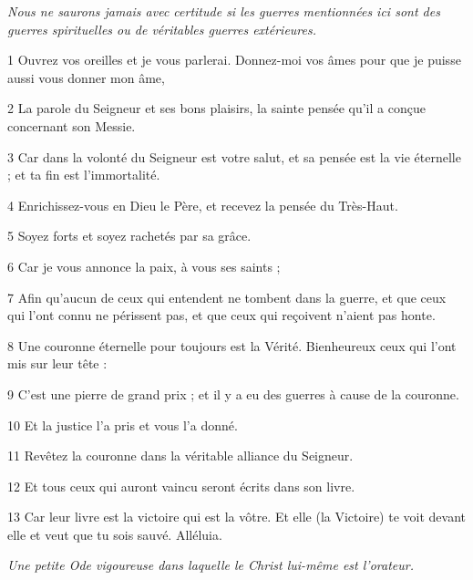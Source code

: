 
\par \textit{Nous ne saurons jamais avec certitude si les guerres mentionnées ici sont des guerres spirituelles ou de véritables guerres extérieures.}

\par 1 Ouvrez vos oreilles et je vous parlerai. Donnez-moi vos âmes pour que je puisse aussi vous donner mon âme,
\par 2 La parole du Seigneur et ses bons plaisirs, la sainte pensée qu'il a conçue concernant son Messie.
\par 3 Car dans la volonté du Seigneur est votre salut, et sa pensée est la vie éternelle ; et ta fin est l'immortalité.
\par 4 Enrichissez-vous en Dieu le Père, et recevez la pensée du Très-Haut.
\par 5 Soyez forts et soyez rachetés par sa grâce.
\par 6 Car je vous annonce la paix, à vous ses saints ;
\par 7 Afin qu'aucun de ceux qui entendent ne tombent dans la guerre, et que ceux qui l'ont connu ne périssent pas, et que ceux qui reçoivent n'aient pas honte.
\par 8 Une couronne éternelle pour toujours est la Vérité. Bienheureux ceux qui l'ont mis sur leur tête :
\par 9 C'est une pierre de grand prix ; et il y a eu des guerres à cause de la couronne.
\par 10 Et la justice l'a pris et vous l'a donné.
\par 11 Revêtez la couronne dans la véritable alliance du Seigneur.
\par 12 Et tous ceux qui auront vaincu seront écrits dans son livre.
\par 13 Car leur livre est la victoire qui est la vôtre. Et elle (la Victoire) te voit devant elle et veut que tu sois sauvé. Alléluia.


\par \textit{Une petite Ode vigoureuse dans laquelle le Christ lui-même est l'orateur.}

